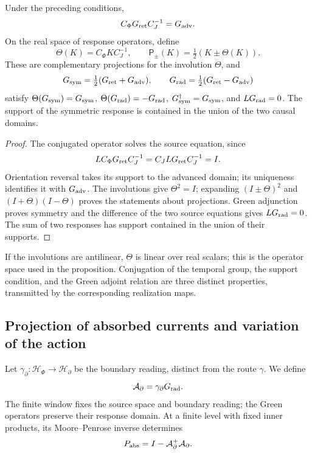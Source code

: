 \begin{proposition}
\label{vii:vii:prop:green-paridades}
Under the preceding conditions,
\[
 C_\Phi G_{\rm ret}C_J^{-1}=G_{\rm adv}.
\]
On the real space of response operators, define
\[
 \Theta(K)=C_\Phi K C_J^{-1},\qquad
 \mathsf P_\pm(K)=\tfrac12(K\pm\Theta(K)).
\]
These are complementary projections for the involution \(\Theta\), and
\begin{equation}
 G_{\rm sym}=\tfrac12(G_{\rm ret}+G_{\rm adv}),\qquad
 G_{\rm rad}=\tfrac12(G_{\rm ret}-G_{\rm adv})
 \label{vii:vii:eq:descomposicion-green}
\end{equation}
satisfy \(\Theta(G_{\rm sym})=G_{\rm sym}\),
\(\Theta(G_{\rm rad})=-G_{\rm rad}\),
\(G_{\rm sym}^{\dagger}=G_{\rm sym}\), and
\(LG_{\rm rad}=0\). The support of the symmetric response is contained
in the union of the two causal domains.
\end{proposition}
\begin{proof}
The conjugated operator solves the source equation, since
\[
 LC_\Phi G_{\rm ret}C_J^{-1}=C_JLG_{\rm ret}C_J^{-1}=I.
\]
Orientation reversal takes its support to the advanced domain;
its uniqueness identifies it with \(G_{\rm adv}\). The involutions give
\(\Theta^2=I\); expanding \((I\pm\Theta)^2\) and
\((I+\Theta)(I-\Theta)\) proves the statements about projections.
Green adjunction proves symmetry and the difference of the two
source equations gives \(LG_{\rm rad}=0\). The sum of two responses
has support contained in the union of their supports.
\end{proof}

If the involutions are antilinear, \(\Theta\) is linear over
real scalars; this is the operator space used in the proposition.
Conjugation of the temporal group, the support condition, and the
Green adjoint relation are three distinct properties, transmitted by the
corresponding realization maps.

\subsection{Projection of absorbed currents and variation of the action}
\label{vii:vii:subsec:proyeccion-absorcion}

Let \(\gamma_\partial:\mathcal H_\Phi\to\mathcal H_\partial\)
be the boundary reading, distinct from the route \(\gamma\). We define
\[
 \mathcal A_\partial=\gamma_\partial G_{\rm rad}.
\]
The finite window fixes the source space and boundary reading;
the Green operators preserve their response domain. At a finite level with
fixed inner products, its Moore--Penrose
inverse determines
\begin{equation}
 P_{\rm abs}=I-\mathcal A_\partial^+\mathcal A_\partial.
 \label{vii:vii:eq:proyector-absorcion}
\end{equation}

